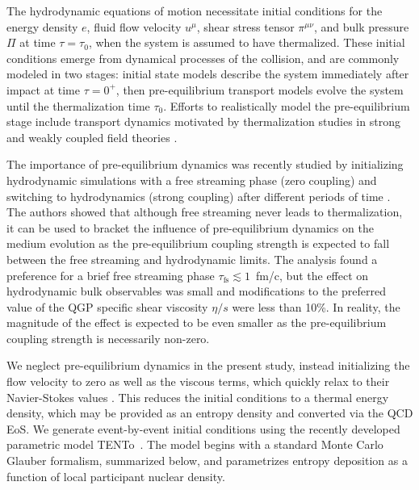 \documentclass[aps,prc,reprint,amsmath,nofootinbib]{revtex4-1}
\newcommand{\trento}{T\raisebox{-0.5ex}{R}ENTo}
\begin{document}
The hydrodynamic equations of motion necessitate initial conditions for the energy density $e$, fluid flow velocity $u^\mu$, shear stress tensor $\pi^{\mu\nu}$, and bulk pressure $\Pi$ at time $\tau = \tau_0$, when the system is assumed to have thermalized.
These initial conditions emerge from dynamical processes of the collision, and are commonly modeled in two stages: initial state models describe the system immediately after impact at time $\tau=0^+$, then pre-equilibrium transport models evolve the system until the thermalization time $\tau_0$.
Efforts to realistically model the pre-equilibrium stage include transport dynamics \cite{Schenke:2012wb, Schenke:2012fw, vanderSchee:2013pia, vanderSchee:2015rta, Chesler:2015fpa} motivated by thermalization studies in strong and weakly coupled field theories \cite{Romatschke:2006nk, Krasnitz:2002ng, Berges:2013eia, Arnold:2004ti, Kurkela:2011ti, Heller:2012km, vanderSchee:2013pia, Rebhan:2004ur, Heller:2011ju, Janik:2006gp}.

The importance of pre-equilibrium dynamics was recently studied by initializing hydrodynamic simulations with a free streaming phase (zero coupling) and switching to hydrodynamics (strong coupling) after different periods of time \cite{Liu:2015nwa, Heinz:2015arc}.
The authors showed that although free streaming never leads to thermalization, it can be used to bracket the influence of pre-equilibrium dynamics on the medium evolution as the pre-equilibrium coupling strength is expected to fall between the free streaming and hydrodynamic limits.
The analysis found a preference for a brief free streaming phase ${\tau_\text{fs} \lesssim 1}$~fm/c, but the effect on hydrodynamic bulk observables was small and modifications to the preferred value of the QGP specific shear viscosity $\eta/s$ were less than 10\%.
In reality, the magnitude of the effect is expected to be even smaller as the pre-equilibrium coupling strength is necessarily non-zero.

We neglect pre-equilibrium dynamics in the present study, instead initializing the flow velocity to zero as well as the viscous terms, which quickly relax to their Navier-Stokes values \cite{Song:2009rh}.
This reduces the initial conditions to a thermal energy density, which may be provided as an entropy density and converted via the QCD EoS.
We generate event-by-event initial conditions using the recently developed parametric model \trento\ \cite{Moreland:2014oya}.
The model begins with a standard Monte Carlo Glauber formalism, summarized below, and parametrizes entropy deposition as a function of local participant nuclear density.
\end{document}
